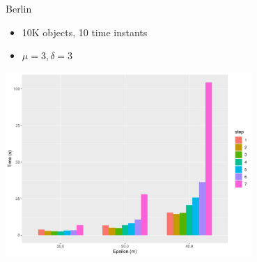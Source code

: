\documentclass{beamer}
\begin{document}
\begin{frame}{Berlin}
    \begin{itemize}
        \item 10K objects, 10 time instants
        \item $\mu=3, \delta=3$
    \end{itemize}

    \centering
    \includegraphics[width=0.7\textwidth]{figures/pflock3_time}
\end{frame}
\end{document}
